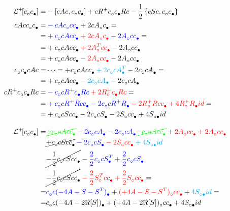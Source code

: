 \documentclass[a4paper,11pt]{article}
\theoremstyle{remark}
\newcommand{\nl}{\vskip 0.3cm}
\newcommand*{\mathcolor}{}  %
\def\mathcolor#1#{\mathcoloraux{#1}}
\newcommand*{\mathcoloraux}[3]{%
  \protect\leavevmode
  \begingroup
    \color#1{#2}#3%
  \endgroup
}
\begin{document}
   \begin{align*}
   \mathcal{L}^+\!\!\left[c^{ }_{\circ}c^{ }_{\bullet}\right] =& - \left[cAc, c^{ }_{\circ} c^{ }_{\bullet}\right] +cR^+c^{ }_{\circ} c^{ }_{\bullet}Rc-\frac{1}{2}\left\{cSc,c^{ }_{\circ}c^{ }_{\bullet}\right\}\\
   cAcc^{ }_{\circ} c^{ }_{\bullet} =&\mathcolor{blue}{-cAc^{ }_{\circ}cc^{ }_{\bullet}} + 2cA^{ }_{\circ} c^{ }_{\bullet} = \\ =&\mathcolor{blue}{+c^{ }_{\circ}cAc c^{ }_{\bullet}} \mathcolor{red}{+2cA^{ }_{\circ} c^{ }_{\bullet}} \mathcolor{blue}{-2 A^{ }_{\circ}cc^{ }_{\bullet}}=\\ 
   =&+c^{ }_{\circ}cAc c^{ }_{\bullet} \mathcolor{red}{+ 2A^T_{\circ}c c^{ }_{\bullet}}-2 A^{ }_{\circ}cc^{ }_{\bullet}\\
   =&+c^{ }_{\circ}cAc c^{ }_{\bullet} \mathcolor{red}{- 2A^{ }_{\circ}c c^{ }_{\bullet}}-2 A^{ }_{\circ}cc^{ }_{\bullet}\\
   c^{ }_{\circ} c^{ }_{\bullet} cAc =& \dots = +c^{ }_{\circ}cAc c^{ }_{\bullet}\mathcolor{cyan}{+2c^{ }_{\circ}c A^T_{\bullet}} -2c^{ }_{\circ}cA^{ }_{\bullet}= \\
   =& +c^{ }_{\circ}cAc c^{ }_{\bullet}\mathcolor{cyan}{-2c^{ }_{\circ}c A_{\bullet}} -2c^{ }_{\circ}cA^{ }_{\bullet}\\
   cR^+c^{ }_{\circ} c^{ }_{\bullet}Rc =& \mathcolor{blue}{-c^{ }_{\circ}cR^+c^{ }_{\bullet}Rc} \mathcolor{red}{+ 2R^+_{\circ}c^{ }_{\bullet}Rc} = \\
   =&\mathcolor{blue}{+c^{ }_{\circ}cR^+Rcc^{ }_{\bullet}-2c^{ }_{\circ}cR^+R^{ }_{\bullet}} \mathcolor{red}{-2R^+_{\circ}Rcc^{ }_{\bullet}+4R^+_{\circ}R^{ }_{\bullet}id}=\\
   =&+c^{ }_{\circ}cScc^{ }_{\bullet}-2c^{ }_{\circ}cS^{ }_{\bullet}-2S^{ }_{\circ}cc^{ }_{\bullet}+4S^{ }_{\circ\bullet}id \\[0.3cm]
   \mathcal{L}^+\!\!\left[c^{ }_{\circ}c^{ }_{\bullet}\right] =&
	     \mathcolor{green}{\cancel{+c^{ }_{\circ}cAc c^{ }_{\bullet}}} \mathcolor{blue}{-2c^{ }_{\circ}c A^{ }_{\bullet} -2c^{ }_{\circ}cA^{ }_{\bullet}}
	     \mathcolor{green}{\cancel{-c^{ }_{\circ}cAc c^{ }_{\bullet}}} \mathcolor{red}{+2A^{ }_{\circ}c c^{ }_{\bullet} +2A^{ }_{\circ}cc^{ }_{\bullet}} \\
	     &\cancel{+ c^{ }_{\circ}cScc^{ }_{\bullet}} \mathcolor{blue}{-2c^{ }_{\circ}cS^{ }_{\bullet}}\mathcolor{red}{-2S^{ }_{\circ}cc^{ }_{\bullet}}\mathcolor{cyan}{+4S^{ }_{\circ\bullet}id} \\
	     &\cancel{-\frac{1}{2}c^{ }_{\circ}cSc c^{ }_{\bullet}} \mathcolor{blue}{-\frac{2}{2}c^{ }_{\circ}c S^T_{\bullet}+\frac{2}{2}c^{ }_{\circ}cS^{ }_{\bullet}} \\
	     &\cancel{-\frac{1}{2}c^{ }_{\circ}cSc c^{ }_{\bullet}}  \mathcolor{red}{-\frac{2}{2}S^T_{\circ}c c^{ }_{\bullet} +\frac{2}{2}S^{ }_{\circ}cc^{ }_{\bullet}}=\\
	    =& \mathcolor{blue}{c^{ }_{\circ}c(-4A-S-S^T)^{ }_{\bullet}} + \mathcolor{red}{(+4A-S-S^T)^{ }_{\circ}cc^{ }_{\bullet}} + \mathcolor{cyan}{4S^{ }_{\circ\bullet}id}=\\
	    =& c^{ }_{\circ}c(-4A-2\Re[S])^{ }_{\bullet} + (+4A-2\Re[S])^{ }_{\circ}cc^{ }_{\bullet} + 4S^{ }_{\circ\bullet}id
   \end{align*} \nl
\end{document}
